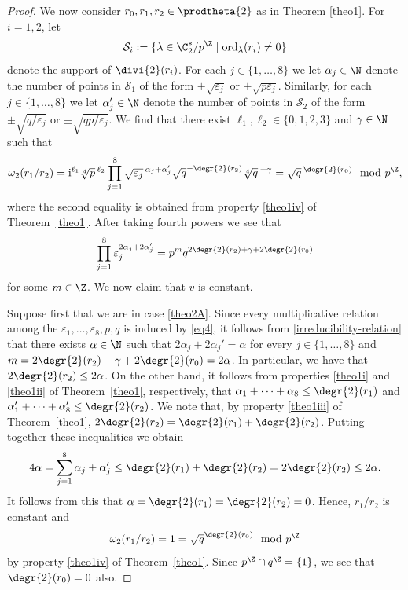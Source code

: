 \begin{proof}
We now consider $r_{0},r_{1},r_{2}\in\prodtheta{2}$ as in Theorem \ref{theo1}. For $i=1,2$, let
\[
\mathcal{S}_i:=\{\lambda\in\C_2^{*}/p^\Z \mid \operatorname{ord}_\lambda(r_i)\neq 0\}
\]
denote the support of $\divi{2}(r_i)$. For each $j\in\{1,\dots,8\}$ we let $\alpha_j\in\N$ denote the number of points in $\mathcal{S}_1$ of the form $\pm\sqrt{\varepsilon_j}$ or $\pm\sqrt{p\varepsilon_j}$. Similarly, for each $j\in\{1,\dots,8\}$ we let $\alpha_j'\in\N$ denote the number of points in $\mathcal{S}_2$ of the form $\pm\sqrt{q/\varepsilon_j}$ or $\pm\sqrt{qp/\varepsilon_j}$. We find that there exist $\ell_1,\ell_2\in\{0,1,2,3\}$ and $\gamma\in\N$ such that
\[
\omega_2(r_1/r_2)=\mathrm{i}^{\ell_1}\sqrt[4]{p}\,^{\ell_2}\prod_{j=1}^8\sqrt{\varepsilon_j}\,^{\alpha_j+\alpha_j'}\sqrt{q}^{-\degr{2}(r_2)}\sqrt[4]{q}{}\,^{-\gamma}=\sqrt{q}\,^{\degr{2}(r_0)} \mod p^\Z,
\]
where the second equality is obtained from property \eqref{theo1iv} of Theorem~\ref{theo1}. After taking fourth powers we see that \begin{equation}\label{irreducibility-relation} \prod_{j=1}^8\varepsilon_j^{2\alpha_j+2\alpha_j'}=p^mq^{2\degr{2}(r_2)+\gamma+2\degr{2}(r_0)}\end{equation} for some $m\in\Z$. We now claim that $v$ is constant.

Suppose first that we are in case \eqref{theo2A}. Since every multiplicative relation among the $\varepsilon_{1},\dots,\varepsilon_{8},p,q$ is induced by \eqref{eq4}, it follows from \eqref{irreducibility-relation} that there exists $\alpha\in\N$ such that $2\alpha_j+2\alpha_j'=\alpha$ for every $j\in\{1,\dots,8\}$ and $m=2\degr{2}(r_2)+\gamma+2\degr{2}(r_0)=2\alpha$. In particular, we have that $2\degr{2}(r_2)\leq 2\alpha$. On the other hand, it follows from properties \eqref{theo1i} and \eqref{theo1ii} of Theorem~\ref{theo1}, respectively, that $\alpha_1+\dots+\alpha_8\leq\degr{2}(r_1)$ and $\alpha_1'+\dots+\alpha_8'\leq\degr{2}(r_2)$. We note that, by property \eqref{theo1iii} of Theorem~\ref{theo1}, $2\degr{2}(r_2)=\degr{2}(r_1)+\degr{2}(r_2)$. Putting together these inequalities we obtain
\[
4\alpha=\sum_{j=1}^8\alpha_j+\alpha_j'\leq\degr{2}(r_1)+\degr{2}(r_2)=2\degr{2}(r_2)\leq 2\alpha.
\]
It follows from this that $\alpha=\degr{2}(r_1)=\degr{2}(r_2)=0$. Hence, $r_1/r_2$ is constant and
\[
\omega_2(r_1/r_2)=1=\sqrt{q}^{\degr{2}(r_0)} \mod p^\Z
\]
by property \eqref{theo1iv} of Theorem~\ref{theo1}. Since $p^\Z\cap q^\Z=\{1\}$, we see that ${\degr{2}(r_0)=0}$ also.


\end{proof}
